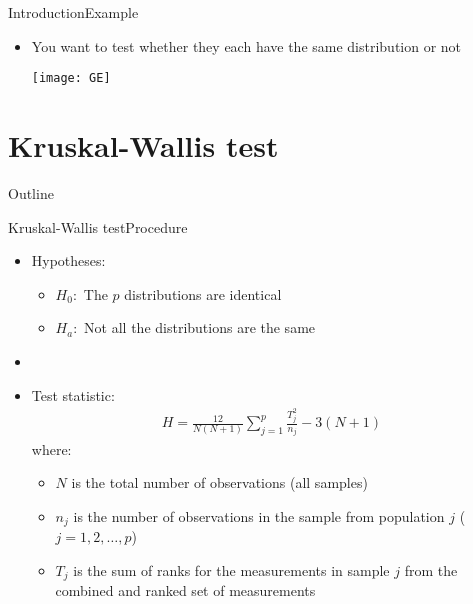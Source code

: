 \documentclass[xcolor=dvipsnames]{beamer}
\begin{document}
\begin{frame}{Introduction}{Example}
	\begin{itemize}
		\item You want to test whether they each have the same distribution or not
		\begin{center}
			\texttt{[image: GE]}
		\end{center}
	\end{itemize}
\end{frame}

\section{Kruskal-Wallis test}

\begin{frame}{Outline}
	\tableofcontents[currentsection,subsectionstyle=show/shaded/hide]
\end{frame}

\begin{frame}{Kruskal-Wallis test}{Procedure}
	\begin{itemize}
		\item Hypotheses:
		\begin{itemize}
			\item $H_0:$ The $p$ distributions are identical \pause
			\item $H_a:$ Not all the distributions are the same
		\end{itemize}
		\item[]
		\item Test statistic: \pause
		\begin{gather*}
		H = \frac{12}{N (N+1)} \sum_{j=1}^p \frac{T_j^2}{n_j} - 3(N + 1)
		\end{gather*}
		where: \pause
		\begin{itemize}
			\item $N$ is the total number of observations (all samples) \pause
			\item $n_j$ is the number of observations in the sample from population $j$ ($j = 1, 2, \hdots, p$) \pause
			\item $T_j$ is the sum of ranks for the measurements in sample $j$ from the combined and ranked set of measurements
		\end{itemize}
	\end{itemize}
\end{frame}
\end{document}
